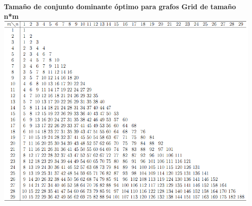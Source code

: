 \begin {center}
\textbf{Tamaño de conjunto dominante óptimo para grafos Grid de tamaño n*m}
\includegraphics[width=18cm]{./graficos/cd_grid_exacto.png}
\end {center} 
\hbox{}
